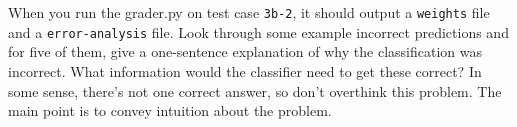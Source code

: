 \item {}

When you run the grader.py on test case {\tt 3b-2}, it should output a
{\tt weights} file and a {\tt error-analysis} file. Look through some example
incorrect predictions and for five of them, give a one-sentence explanation of
why the classification was incorrect. What information would the classifier
need to get these correct? In some sense, there's not one correct answer, so
don't overthink this problem. The main point is to convey intuition about the
problem.
